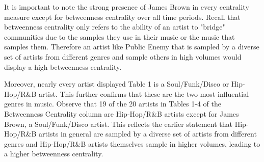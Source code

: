 \documentclass[pageno]{jpaper}
\begin{document}
It is important to note the strong presence of James Brown in every centrality measure except for betweenness centrality over all time periods. Recall that betweenness centrality only refers to the ability of an artist to "bridge" communities due to the samples they use in their music or the music that samples them. Therefore an artist like Public Enemy that is sampled by a diverse set of artists from different genres and sample others in high volumes would display a high betweenness centrality.

Moreover, nearly every artist displayed Table 1 is a Soul/Funk/Disco or Hip-Hop/R\&B artist. This further confirms that these are the two most influential genres in music. Observe that 19 of the 20 artists in Tables 1-4 of the Betweenness Centrality column are Hip-Hop/R\&B artists except for James Brown, a Soul/Funk/Disco artist. This reflects the earlier statement that Hip-Hop/R\&B artists in general are sampled by a diverse set of artists from different genres and Hip-Hop/R\&B artists themselves sample in higher volumes, leading to a higher betweenness centrality.
\begin{table}[H]
\caption{Top Artists by Centrality (1980's)}
\label{table:table2}
\end{table}
\end{document}

